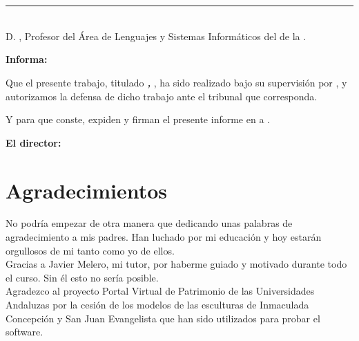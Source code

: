 \chapter*{}
\thispagestyle{empty}

\noindent\rule[-1ex]{\textwidth}{2pt}\\[4.5ex]

D. \textbf{\myProf}, Profesor del Área de Lenguajes y Sistemas Informáticos del \myDepartment de la \myUni.

\vspace{0.5cm}

\textbf{Informa:}

\vspace{0.5cm}

Que el presente trabajo, titulado \textit{\textbf{\myTitle, \mySubtitle}}, ha sido realizado bajo su supervisión por \textbf{\myName}, y autorizamos la defensa de dicho trabajo ante el tribunal que corresponda.

\vspace{0.5cm}

Y para que conste, expiden y firman el presente informe en \myLocation a \myTime.

\vspace{1cm}

\textbf{El director:}

\vspace{5cm}

\noindent \textbf{\myProf}

\chapter*{Agradecimientos}
\thispagestyle{empty}

\vspace{1cm}

No podría empezar de otra manera que dedicando unas palabras de agradecimiento a mis padres. Han luchado por mi educación y hoy estarán orgullosos de mi tanto como yo de ellos.
\\

Gracias a Javier Melero, mi tutor, por haberme guiado y motivado durante todo el curso. Sin él esto no sería posible.
\\

Agradezco al proyecto Portal Virtual de Patrimonio de las Universidades Andaluzas por la cesión de los modelos de las esculturas de Inmaculada Concepción y San Juan Evangelista que han sido utilizados para probar el software.
\\

